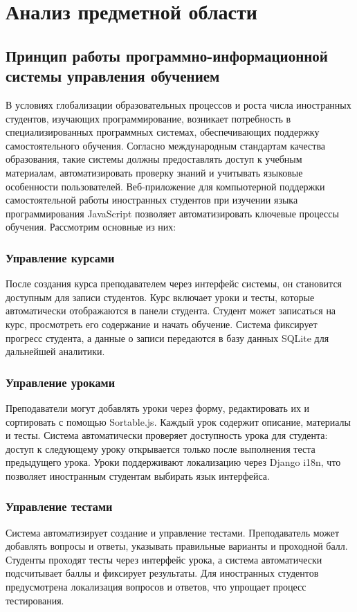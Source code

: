 \section{Анализ предметной области}
\subsection{Принцип работы программно-информационной системы управления обучением}

В условиях глобализации образовательных процессов и роста числа иностранных студентов, изучающих программирование, возникает потребность в специализированных программных системах, обеспечивающих поддержку самостоятельного обучения. Согласно международным стандартам качества образования, такие системы должны предоставлять доступ к учебным материалам, автоматизировать проверку знаний и учитывать языковые особенности пользователей. Веб-приложение для компьютерной поддержки самостоятельной работы иностранных студентов при изучении языка программирования JavaScript позволяет автоматизировать ключевые процессы обучения. Рассмотрим основные из них:

\subsubsection{Управление курсами}
После создания курса преподавателем через интерфейс системы, он становится доступным для записи студентов. Курс включает уроки и тесты, которые автоматически отображаются в панели студента. Студент может записаться на курс, просмотреть его содержание и начать обучение. Система фиксирует прогресс студента, а данные о записи передаются в базу данных SQLite для дальнейшей аналитики.

\subsubsection{Управление уроками}
Преподаватели могут добавлять уроки через форму, редактировать их и сортировать с помощью Sortable.js. Каждый урок содержит описание, материалы и тесты. Система автоматически проверяет доступность урока для студента: доступ к следующему уроку открывается только после выполнения теста предыдущего урока. Уроки поддерживают локализацию через Django i18n, что позволяет иностранным студентам выбирать язык интерфейса.


\subsubsection{Управление тестами}
Система автоматизирует создание и управление тестами. Преподаватель может добавлять вопросы и ответы, указывать правильные варианты и проходной балл. Студенты проходят тесты через интерфейс урока, а система автоматически подсчитывает баллы и фиксирует результаты. Для иностранных студентов предусмотрена локализация вопросов и ответов, что упрощает процесс тестирования.


